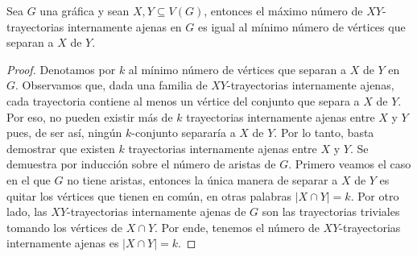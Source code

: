 
\begin{teorema}
    \label{teo:menger}
    Sea $G$ una gr\'afica y sean $X, Y \subseteq V(G)$, entonces el m\'aximo
    n\'umero de $XY$-trayectorias internamente ajenas en $G$ es igual al
    m\'inimo n\'umero de v\'ertices que separan a $X$ de $Y$.
\end{teorema}

\begin{proof}
    Denotamos por $k$ al m\'inimo n\'umero de v\'ertices que separan a $X$ de
    $Y$ en $G$. Observamos que, dada una familia de $XY$-trayectorias
    internamente ajenas, cada trayectoria contiene al menos un v\'ertice del
    conjunto que separa a $X$ de $Y$. Por eso, no pueden existir m\'as de $k$
    trayectorias internamente ajenas entre $X$ y $Y$ pues, de ser as\'i,
    ning\'un $k$-conjunto separar\'ia a $X$ de $Y$. Por lo tanto, basta
    demostrar que existen $k$ trayectorias internamente ajenas entre $X$ y $Y$.
    Se demuestra por inducci\'on sobre el n\'umero de aristas de $G$. Primero
    veamos el caso en el que $G$ no tiene aristas, entonces la \'unica manera de
    separar a $X$ de $Y$ es quitar los v\'ertices que tienen en com\'un, en
    otras palabras $|X \cap Y|=k$. Por otro lado, las $XY$-trayectorias
    internamente ajenas de $G$ son las trayectorias triviales tomando los
    v\'ertices de $X \cap Y$. Por ende, tenemos el n\'umero de $XY$-trayectorias
    internamente ajenas es $|X\cap Y|=k$.


\end{proof}
